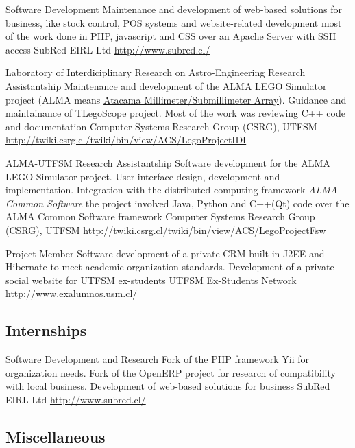 \documentclass[11pt,a4paper,sans]{moderncv}
\begin{document}
        {Software Development}
        {Maintenance and development of web-based solutions for business, like stock control, POS systems and website-related development}
        {most of the work done in PHP, javascript and CSS over an Apache Server with SSH access}
        {SubRed EIRL Ltd}
        {\url{http://www.subred.cl/}}

        {Laboratory of Interdiciplinary Research on Astro-Engineering Research Assistantship}
        {Maintenance and development of the ALMA LEGO Simulator project (ALMA means \href{http://www.alma.cl/}{Atacama Millimeter/Submillimeter Array)}. Guidance and maintainance of TLegoScope project.}
        {Most of the work was reviewing C++ code and documentation}
        {Computer Systems Research Group (CSRG), UTFSM}
        {\url{http://twiki.csrg.cl/twiki/bin/view/ACS/LegoProjectIDI}}

        {ALMA-UTFSM Research Assistantship}
        {Software development for the ALMA LEGO Simulator project. User interface design, development and implementation. Integration with the distributed computing framework \emph{ALMA Common Software}}
        {the project involved Java, Python and C++(Qt) code over the ALMA Common Software framework}
        {Computer Systems Research Group (CSRG), UTFSM}
        {\url{http://twiki.csrg.cl/twiki/bin/view/ACS/LegoProjectFsw}}
        
        {Project Member}
        {Software development of a private CRM built in J2EE and Hibernate to meet academic-organization standards. Development of a private social website for UTFSM ex-students}
        {UTFSM Ex-Students Network}
        {}
        {\url{http://www.exalumnos.usm.cl/}}
        
        
\subsection{Internships}


        {Software Development and Research}
        {Fork of the PHP framework Yii for organization needs. Fork of the OpenERP project for research of compatibility with local business. Development of web-based solutions for business}
        {SubRed EIRL Ltd}
        {}
        {\url{http://www.subred.cl/}}
        
        
\subsection{Miscellaneous}
\end{document}
